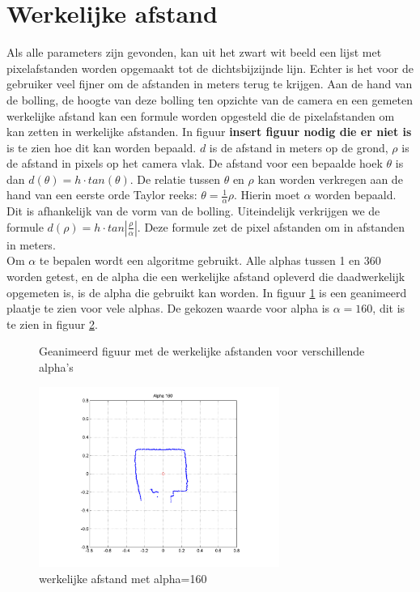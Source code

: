 \documentclass[a4paper]{article}
\begin{document}
\section{Werkelijke afstand}
Als alle parameters zijn gevonden, kan uit het zwart wit beeld een lijst met pixelafstanden worden opgemaakt tot de dichtsbijzijnde lijn. Echter is het voor de gebruiker veel fijner om de afstanden in meters terug te krijgen. Aan de hand van de bolling, de hoogte van deze bolling ten opzichte van de camera en een gemeten werkelijke afstand kan een formule worden opgesteld die de pixelafstanden om kan zetten in werkelijke afstanden. In figuur \textbf{insert figuur nodig die er niet is} is te zien hoe dit kan worden bepaald. $d$ is de afstand in meters op de grond, $\rho$ is de afstand in pixels op het camera vlak. De afstand voor een bepaalde hoek $\theta$ is dan $d(\theta)=h \cdot tan(\theta)$. De relatie tussen $\theta$ en $\rho$ kan worden  verkregen aan de hand van een eerste orde Taylor reeks: $\theta = \frac{1}{\alpha}\rho$. Hierin moet $\alpha$ worden bepaald. Dit is afhankelijk van de vorm van de bolling. Uiteindelijk verkrijgen we de formule $d(\rho)=h\cdot tan|\frac{\rho}{\alpha}|$. Deze formule zet de pixel afstanden om in afstanden in meters.\\
Om $\alpha$ te bepalen wordt een algoritme gebruikt. Alle alphas tussen 1 en 360 worden getest, en de alpha die een werkelijke afstand opleverd die daadwerkelijk opgemeten is, is de alpha die gebruikt kan worden. In figuur \ref{fig:anim_alpha} is een geanimeerd plaatje te zien voor vele alphas. De gekozen waarde voor alpha is $\alpha = 160$, dit is te zien in figuur \ref{fig:alpha160}.

\begin{figure}[htbp]
	\caption{Geanimeerd figuur met de werkelijke afstanden voor verschillende alpha's}
 	\label{fig:anim_alpha}
\end{figure}

\begin{figure}[h]
	\centering
	\includegraphics[width=0.7\textwidth]{img/alpha/alpha_160.png}
	\caption{werkelijke afstand met alpha=160}
	\label{fig:alpha160}
\end{figure}
\end{document}
